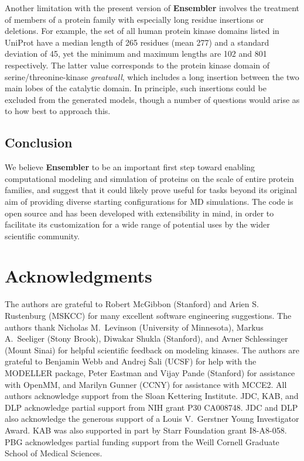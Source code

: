 \documentclass[aps,prl,preprint,nofootinbib,superscriptaddress,linenumbers]{revtex4-1}
\begin{document}
Another limitation with the present version of {\bf Ensembler} involves the treatment of members of a protein family with especially long residue insertions or deletions.
For example, the set of all human protein kinase domains listed in UniProt have a median length of 265 residues (mean 277) and a standard deviation of 45, yet the minimum and maximum lengths are 102 and 801 respectively.
The latter value corresponds to the protein kinase domain of serine/threonine-kinase \emph{greatwall}, which includes a long insertion between the two main lobes of the catalytic domain.
In principle, such insertions could be excluded from the generated models, though a number of questions would arise as to how best to approach this.

\subsection*{Conclusion}

We believe {\bf Ensembler} to be an important first step toward enabling computational modeling and simulation of proteins on the scale of entire protein families, and suggest that it could likely prove useful for tasks beyond its original aim of providing diverse starting configurations for MD simulations.
The code is open source and has been developed with extensibility in mind, in order to facilitate its customization for a wide range of potential uses by the wider scientific community.


\section{Acknowledgments}
\label{section:acknowledgments}

The authors are grateful to Robert McGibbon (Stanford) and Arien S. Rustenburg (MSKCC) for many excellent software engineering suggestions.
The authors thank Nicholas M.~Levinson (University of Minnesota), Markus A.~Seeliger (Stony Brook), Diwakar Shukla (Stanford), and Avner Schlessinger (Mount Sinai) for helpful scientific feedback on modeling kinases.
The authors are grateful to Benjamin Webb and Andrej \v{S}ali (UCSF) for help with the MODELLER package, Peter Eastman and Vijay Pande (Stanford) for assistance with OpenMM, and Marilyn Gunner (CCNY) for assistance with MCCE2.
All authors acknowledge support from the Sloan Kettering Institute.
JDC, KAB, and DLP acknowledge partial support from NIH grant P30 CA008748.
JDC and DLP also acknowledge the generous support of a Louis V.~Gerstner Young Investigator Award.
KAB was also supported in part by Starr Foundation grant I8-A8-058.
PBG acknowledges partial funding support from the Weill Cornell Graduate School of Medical Sciences.
\end{document}
